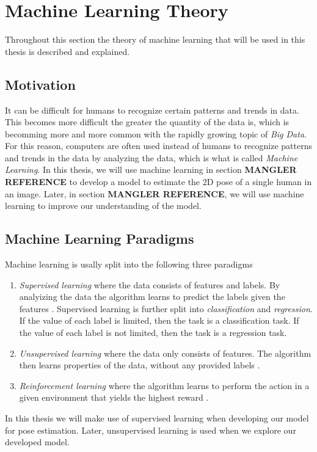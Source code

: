 \documentclass[main.tex]{subfiles}
\begin{document}
\section{Machine Learning Theory}
Throughout this section the theory of machine learning that will be used in this thesis is described and explained.

\subsection{Motivation}
It can be difficult for humans to recognize certain patterns and trends in data. This becomes more difficult the greater the quantity of the data is, which is becomming more and more common with the rapidly growing topic of \textit{Big Data}. For this reason, computers are often used instead of humans to recognize patterns and trends in the data by analyzing the data, which is what is called \textit{Machine Learning}. In this thesis, we will use machine learning in section \textbf{MANGLER REFERENCE} to develop a model to estimate the 2D pose of a single human in an image. Later, in section \textbf{MANGLER REFERENCE}, we will use machine learning to improve our understanding of the model.

\subsection{Machine Learning Paradigms}
Machine learning is usally split into the following three paradigms
\begin{enumerate}
    \item \textit{Supervised learning} where the data consists of features and labels. By analyizing the data the algorithm learns to predict the labels given the features \cite{ESL}. Supervised learning is further split into \textit{classification} and \textit{regression}. If the value of each label is limited, then the task is a classification task. If the value of each label is not limited, then the task is a regression task. 
    \item \textit{Unsupervised learning} where the data only consists of features. The algorithm then learns properties of the data, without any provided labels \cite{ESL}.
    \item \textit{Reinforcement learning} where the algorithm learns to perform the action in a given environment that yields the highest reward \cite{PRML}.
\end{enumerate}
In this thesis we will make use of supervised learning when developing our model for pose estimation. Later, unsupervised learning is used when we explore our developed model.
\end{document}
